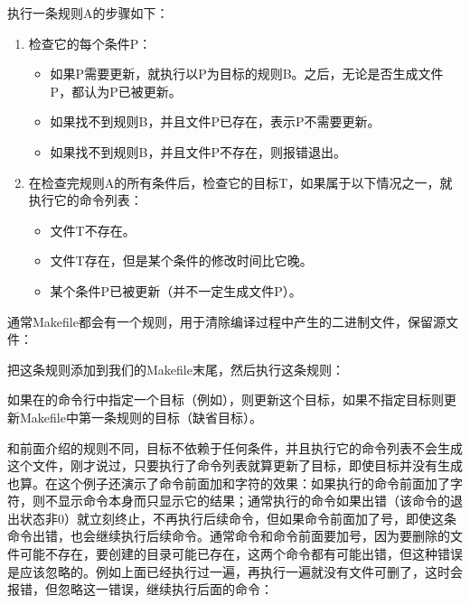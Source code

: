 执行一条规则A的步骤如下：


\begin{enumerate}

\item 检查它的每个条件P：


\begin{itemize}

\item 如果P需要更新，就执行以P为目标的规则B。之后，无论是否生成文件P，都认为P已被更新。

\item 如果找不到规则B，并且文件P已存在，表示P不需要更新。

\item 如果找不到规则B，并且文件P不存在，则报错退出。
\end{itemize}

\item 在检查完规则A的所有条件后，检查它的目标T，如果属于以下情况之一，就执行它的命令列表：


\begin{itemize}

\item 文件T不存在。

\item 文件T存在，但是某个条件的修改时间比它晚。

\item 某个条件P已被更新（并不一定生成文件P）。
\end{itemize}
\end{enumerate}


通常Makefile都会有一个规则，用于清除编译过程中产生的二进制文件，保留源文件：




把这条规则添加到我们的Makefile末尾，然后执行这条规则：




如果在的命令行中指定一个目标（例如），则更新这个目标，如果不指定目标则更新Makefile中第一条规则的目标（缺省目标）。



和前面介绍的规则不同，目标不依赖于任何条件，并且执行它的命令列表不会生成这个文件，刚才说过，只要执行了命令列表就算更新了目标，即使目标并没有生成也算。在这个例子还演示了命令前面加和\BookCode{-\BookSplit{}}字符的效果：如果执行的命令前面加了字符，则不显示命令本身而只显示它的结果；通常执行的命令如果出错（该命令的退出状态非0）就立刻终止，不再执行后续命令，但如果命令前面加了\BookCode{-\BookSplit{}}号，即使这条命令出错，也会继续执行后续命令。通常命令和命令前面要加\BookCode{-\BookSplit{}}号，因为要删除的文件可能不存在，要创建的目录可能已存在，这两个命令都有可能出错，但这种错误是应该忽略的。例如上面已经执行过一遍，再执行一遍就没有文件可删了，这时会报错，但忽略这一错误，继续执行后面的命令：


